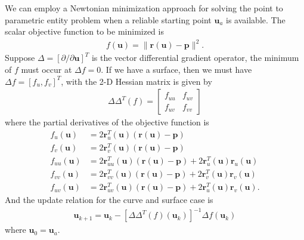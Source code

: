  We can employ a Newtonian minimization approach for solving the point to parametric entity problem when a reliable starting point $\bm{u}_a$ is available. The scalar objective function to be minimized is 
 \begin{align}
 	f(\bm{u}) = \| \bm{r}(\bm{u}) - \bm{p} \|^2.
 \end{align}
 Suppose $\Delta = \left[\partial/\partial \bm{u}\right]^T$ is the vector differential gradient operator, the minimum of $f$ must occur at $\Delta f = 0$. If we have a surface, then we must have $\Delta f = \left[f_u, f_v\right]^T$, with the 2-D Hessian matrix is given by
 \begin{align}
 	\Delta \Delta^T(f) = \begin{bmatrix}
 	f_{uu} & f_{uv} \\
 	f_{uv} & f_{vv}
 	\end{bmatrix}
 \end{align}
 where the partial derivatives of the objective function is
 \begin{subequations}
 	\begin{align}
 	f_u(\bm{u}) &= 2 \bm{r}_u^T(\bm{u})(\bm{r}(\bm{u})-\bm{p}) \\
 	f_v(\bm{u}) &= 2 \bm{r}_v^T(\bm{u})(\bm{r}(\bm{u})-\bm{p}) \\
 	f_{uu}(\bm{u}) &= 2 \bm{r}_{uu}^T(\bm{u})(\bm{r}(\bm{u})-\bm{p}) + 2 \bm{r}_u^T(\bm{u})  \bm{r}_u(\bm{u}) \\
 	f_{vv}(\bm{u}) &= 2 \bm{r}_{vv}^T(\bm{u})(\bm{r}(\bm{u})-\bm{p}) + 2 \bm{r}_v^T(\bm{u})  \bm{r}_v(\bm{u}) \\
 	f_{uv}(\bm{u}) &= 2 \bm{r}_{uv}^T(\bm{u})(\bm{r}(\bm{u})-\bm{p}) + 2 \bm{r}_u^T(\bm{u})  \bm{r}_v(\bm{u}).
 	\end{align}
 \end{subequations}
%
And the update relation for the curve and surface case is
%
\begin{align}
	\bm{u}_{k+1} = \bm{u}_k - \left[\Delta \Delta^T(f)(\bm{u}_k)\right]^{-1} \Delta f(\bm{u}_k)
\end{align}
 where $\bm{u}_0 = \bm{u}_a$. 
  

